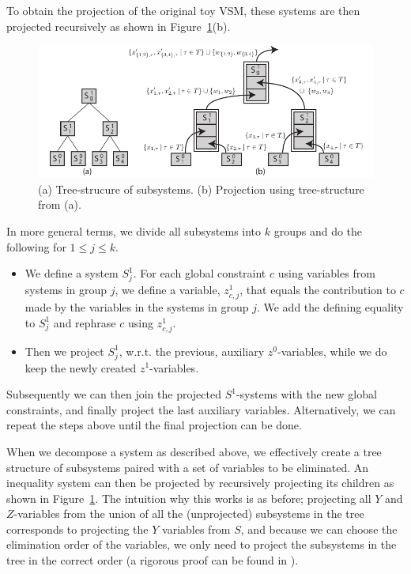 \documentclass{llncs}
\begin{document}
To obtain the projection of the original toy VSM, these systems are then projected recursively as shown in Figure~\ref{fig:decomp2}(b).
%
\begin{figure}[bt]
	\centering
		\includegraphics[scale=0.9]{figures/Example6.pdf}
	\caption{(a) Tree-strucure of subsystems. (b) Projection using tree-structure from (a).}
	\label{fig:decomp2}
\end{figure}

In more general terms, we divide all subsystems into $k$ groups and do the following for $1\leq j\leq k$. 
\begin{itemize}[noitemsep,topsep=0pt]%
\item We define a system $S^1_j$. For each global constraint $c$ using variables from systems in group $j$, we define a variable, $z^1_{c,j}$, that equals the contribution to $c$ made by the variables in the systems in group $j$. We add the defining equality to $S^1_j$ and rephrase $c$ using $z^1_{c,j}$.
\item Then we project $S^1_j$, w.r.t. the previous, auxiliary $z^0$-variables, while we do keep the newly created $z^1$-variables.
\end{itemize} 
Subsequently we can then join the projected $S^1$-systems with the new global constraints, and finally project the last auxiliary variables. Alternatively, we can repeat the steps above until the final projection can be done. 

When we decompose a system as described above, we effectively create a tree structure of subsystems paired with a set of variables to be eliminated. An inequality system can then be projected by recursively projecting its children as shown in Figure~\ref{fig:decomp2}.
The intuition why this works is as before; projecting all $Y$ and $Z$-variables from the union of all the (unprojected) subsystems in the tree corresponds to projecting the $Y$ variables from $S$, and because we can choose the elimination order of the variables, we only need to project the subsystems in the tree in the correct order (a rigorous proof can be found in \cite{mytechrep}).
\end{document}
